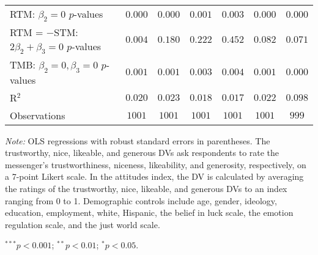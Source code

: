 \begin{table}[!t]
\begin{center}
{\begin{threeparttable}
\begin{tabular}{l c c c c c c}
RTM: $\beta_2 = 0$ $p$-values                   & $0.000$       & $0.000$       & $0.001$       & $0.003$       & $0.000$       & $0.000$       \\
RTM = $-$STM: $2\beta_2+\beta_3 = 0$ $p$-values & $0.004$       & $0.180$       & $0.222$       & $0.452$       & $0.082$       & $0.071$       \\
TMB: $\beta_2 = 0, \beta_3 = 0$ $p$-values      & $0.001$       & $0.001$       & $0.003$       & $0.004$       & $0.001$       & $0.000$       \\
R$^2$                                           & $0.020$       & $0.023$       & $0.018$       & $0.017$       & $0.022$       & $0.098$       \\
Observations                                    & $1001$        & $1001$        & $1001$        & $1001$        & $1001$        & $999$         \\
\bottomrule
\end{tabular}
\begin{tablenotes}[flushleft]
\scriptsize{\item[\hspace{-5mm}] \textit{Note:} OLS regressions with robust standard errors in parentheses. 
            The trustworthy, nice, likeable, and generous DVs ask respondents to rate the messenger's trustworthiness, niceness, likeability, and generosity, respectively,
on a 7-point Likert scale. In the attitudes index, the DV is calculated by averaging the ratings of the trustworthy, nice, likeable, and generous DVs to an index ranging from 0 to 1. 
                                Demographic controls include age, gender, ideology,
                                education, employment, white, Hispanic, the belief in luck scale, the emotion regulation scale, and the just world scale. \item[\hspace{-5mm}] $^{***}p<0.001$; $^{**}p<0.01$; $^{*}p<0.05$.}
\end{tablenotes}
\end{threeparttable}
}
\label{tab:attitude_unrelated_regression}
\end{center}
\end{table}

\renewcommand{\baselinestretch}{1.67}%
